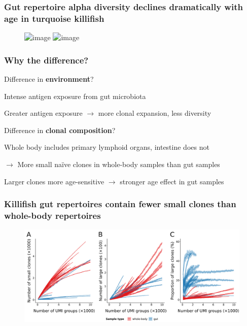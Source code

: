 \documentclass[presentation]{beamer}
\begin{document}
\begin{frame}
\frametitle{Gut repertoire alpha diversity declines dramatically with age in turquoise killifish}
\begin{figure}
\includegraphics<1,3>[width=\textwidth]{figs/pdf/igseq-gut-combined-diversity-alpha}
\includegraphics<2>[width=\textwidth]{figs/pdf/igseq-ageing-combined-diversity-alpha}
\end{figure}
\end{frame}

\begin{frame}
\frametitle{Why the difference?}
\Large
\begin{wideenum}{1}\pause
\item Difference in \textbf{environment}?\vspace{0.5em}
\begin{wideitemize}{0.5}\pause
\item Intense antigen exposure from gut microbiota
\item Greater antigen exposure $\to$ more clonal expansion, less diversity\pause
\end{wideitemize}
\item Difference in \textbf{clonal composition}?\vspace{0.5em}
\begin{wideitemize}{0.5}\pause
\item Whole body includes primary lymphoid organs, intestine does not
\item $\to$ More small na\"ive clones in whole-body samples than gut samples
\item Larger clones more age-sensitive $\to$ stronger age effect in gut samples
\end{wideitemize}
\end{wideenum}
\end{frame}

\begin{frame}
\frametitle{Killifish gut repertoires contain fewer \textbf{small} clones than whole-body repertoires}
\begin{figure}
\includegraphics[width = \textwidth]{../_Figures/png/igseq-rarefied-clone-2colour-counts-size.png}
\end{figure}
\end{frame}
\end{document}
